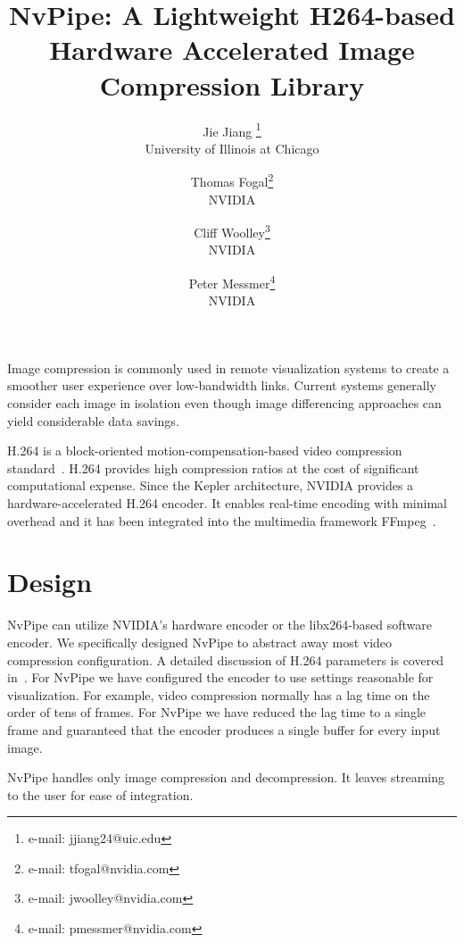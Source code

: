 \documentclass[review]{vgtc}                 %
\title{NvPipe: A Lightweight H264-based Hardware Accelerated Image Compression Library}
\author{Jie Jiang \thanks{e-mail: jjiang24@uic.edu}\\ %
        \scriptsize University of Illinois at Chicago %
\and Thomas Fogal\thanks{e-mail: tfogal@nvidia.com}\\ %
     \scriptsize NVIDIA %
\and Cliff Woolley\thanks{e-mail: jwoolley@nvidia.com}\\ %
     \scriptsize NVIDIA %
\and Peter Messmer\thanks{e-mail: pmessmer@nvidia.com}\\ %
     \scriptsize NVIDIA} %
\begin{document}


\maketitle

Image compression is commonly used in remote visualization systems to create a smoother user experience over low-bandwidth links. Current systems generally consider each image in isolation even though image differencing approaches can yield considerable data savings.

H.264 is a block-oriented motion-compensation-based video compression standard~\cite{wiegand2003overview}. H.264 provides high compression ratios at the cost of significant computational expense. Since the Kepler architecture, NVIDIA provides a hardware-accelerated H.264 encoder. It enables real-time encoding with minimal overhead and it has been integrated into the multimedia framework FFmpeg~\cite{ffmpeg}. 

\section{Design}

NvPipe can utilize NVIDIA's hardware encoder or the libx264-based software encoder. We specifically designed NvPipe to abstract away most video compression configuration. A detailed discussion of H.264 parameters is covered in~\cite{iszaidyinvestigation}. For NvPipe we have configured the encoder to use settings reasonable for visualization. For example, video compression normally has a lag time on the order of tens of frames. For NvPipe we have reduced the lag time to a single frame and guaranteed that the encoder produces a single buffer for every input image. 

NvPipe handles only image compression and decompression. It leaves streaming to the user for ease of integration.

\end{document}
